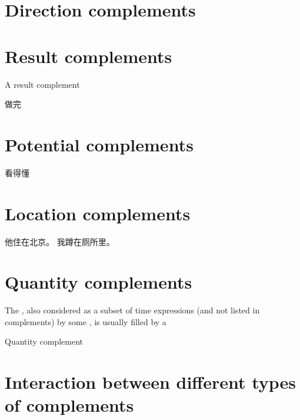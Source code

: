 \documentclass[../main.tex]{subfiles}
\begin{document}

\section{Direction complements}\label{sec:direction-complement}

\section{Result complements}\label{sec:result-complement}

A result complement 

做完

\section{Potential complements}\label{sec:potential-complement}

看得懂

\section{Location complements}\label{sec:location-complement}

\begin{exe}
    \ex \begin{xlist}
        \ex 他住在北京。
        \ex 我蹲在厕所里。
    \end{xlist}
\end{exe}

\section{Quantity complements}\label{sec:quantity-complement}

The , also considered as a subset of time expressions (and not listed in complements)
by some \citet[sec. 7.2-7.4]{po2015chinese}, is usually filled by a %

Quantity complement 

\section{Interaction between different types of complements}

\end{document}
